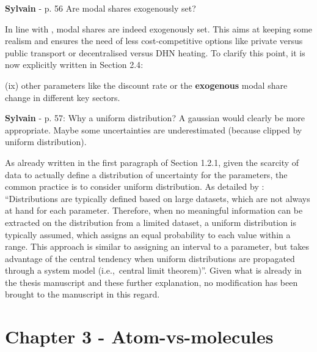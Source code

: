 \documentclass[12pt,a4paper]{article}
\def\ie{i.e.,\ }
\begin{document}
\begin{mdframed}[style=comment] %
{\color{purple} \textbf{Sylvain}} - p. 56 Are modal shares exogenously set?
\end{mdframed}

\noindent In line with \citet{limpens2019energyscope}, modal shares are indeed exogenously set. This aims at keeping some realism and ensures the need of less cost-competitive options like private versus public transport or decentralised versus DHN heating. To clarify this point, it is now explicitly written {\color{blue}in Section 2.4}:

\begin{mdframed}[style=manuscript] %
[...] (ix) other parameters like the discount rate or the \textbf{exogenous} modal share change in different key sectors.
\end{mdframed}

\begin{mdframed}[style=comment] %
{\color{purple} \textbf{Sylvain}} - p. 57: Why a uniform distribution? A gaussian would clearly be more appropriate. Maybe some uncertainties are underestimated (because clipped by uniform distribution).
\end{mdframed}

\noindent As already written in the first paragraph of Section 1.2.1, given the scarcity of data to actually define a distribution of uncertainty for the parameters, the common practice is to consider uniform distribution. As detailed by \citet{coppittersthesis}: ``Distributions are typically defined based on large datasets, which are not always at hand for each parameter. Therefore, when no meaningful information can be extracted on the distribution from a limited dataset, a uniform distribution is typically assumed, which assigns an equal probability to each value within a range. This approach is similar to assigning an interval to a parameter, but takes advantage of the central tendency when uniform distributions are propagated through a system model (\ie central limit theorem)''. Given what is already in the thesis manuscript and these further explanation, no modification has been brought to the manuscript in this regard. 

\section{Chapter 3 - Atom-vs-molecules}
\label{Chap_atom_vs_molecules}
\end{document}
